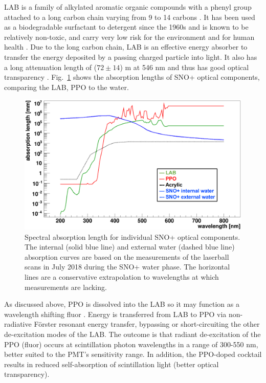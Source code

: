 LAB is a family of alkylated aromatic organic compounds with a phenyl group attached to a long carbon chain varying from 9 to 14 carbons \cite{wiki_LAB, collaboration2020development}. It has been used as a biodegradable surfactant to detergent since the 1960s and is known to be relatively non-toxic, and carry very low risk for the environment and for human health \cite{wiki_LAB}. Due to the long carbon chain, LAB is an effective energy absorber to transfer the energy deposited by a passing charged particle into light. It also has a long attenuation length of ($72\pm 14$) m at 546 nm and thus has good optical transparency \cite{snop_jinst}. Fig.~\ref{absLength} shows the absorption lengths of SNO+ optical components, comparing the LAB, PPO to the water.
\begin{figure}[!htb]
	\centering
	\includegraphics[width=12cm]{absLength.png}
	\caption[Spectral absorption length for SNO+ optical components.]{Spectral absorption length for individual SNO+ optical components. The internal (solid blue line) and external water (dashed blue line) absorption curves are based on the measurements of the laserball scans in July 2018 during the SNO+ water phase. The horizontal lines are a conservative extrapolation to wavelengths at which measurements are lacking.}
	\label{absLength}
\end{figure}

As discussed above, PPO is dissolved into the LAB so it may function as a wavelength shifting fluor \cite{wunderly1990new}. Energy is transferred from LAB to PPO via non-radiative F{\"o}rster resonant energy transfer, bypassing or short-circuiting the other de-excitation modes of the LAB. The outcome is that radiant de-excitation of the PPO (fluor) occurs at scintillation photon wavelengths in a range of 300-550 nm, better suited to the PMT's sensitivity range. In addition, the PPO-doped cocktail results in reduced self-absorption of scintillation light (better optical transparency). 

